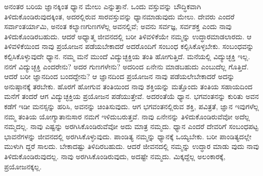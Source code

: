 ಅನಂತರ ಬರಿಯ ಜ್ಞಾನಕ್ಕಿಂತ ಧ್ಯಾನ ಮೇಲು ಎನ್ನುತ್ತಾನೆ. ಒಂದು ವಸ್ತುವನ್ನು ಬೌದ್ಧಿಕವಾಗಿ ತಿಳಿದುಕೊಂಡಿರುವುದಕ್ಕಿಂತ, ಅದರಲ್ಲಿರುವ ಸಾರವಸ್ತುವನ್ನು ಧ್ಯಾನಮಾಡುವುದು ಮೇಲು. ದೇವರು ಎಂದರೆ ಸರ್ವಾಂತರ್ಯಾಮಿ, ಅನಂತ ಕಲ್ಯಾಣಗುಣಗಳೆಲ್ಲ ಅವನಲ್ಲಿವೆ; ಅವನು ಸರ್ವಜ್ಞ, ಸರ್ವಶಕ್ತ ಎಂದು ನಾವು ತಿಳಿದುಕೊಂಡಿರಬಹುದು. ಆದರೆ ಅಧ್ಯಾತ್ಮ ಜೀವನದಲ್ಲಿ ಬರೀ ತಿಳಿವಳಿಕೆಯೇ ನಮ್ಮನ್ನು ಉದ್ಧಾರಮಾಡಲಾರದು. ಆ ತಿಳಿವಳಿಕೆಯಿಂದ ನಾವು ಪ್ರಯೋಜನ ಪಡೆಯಬೇಕಾದರೆ ಅದರೊಂದಿಗೆ ಸಂಬಂಧ ಕಲ್ಪಿಸಿಕೊಳ್ಳಬೇಕು. ಸಂಬಂಧವನ್ನು ಕಲ್ಪಿಸಿಕೊಳ್ಳುವುದೇ ಧ್ಯಾನ. ನಮ್ಮ ಮನೆ ಮುಂದೆ ವಿದ್ಯುಚ್ಛಕ್ತಿಯ ತಂತಿ ಹೋಗುತ್ತಿದೆ. ಮನೆಯಲ್ಲಿ ವಿದ್ಯುಚ್ಛಕ್ತಿ ಇಲ್ಲ. ನನಗೆ ವಿದ್ಯುಚ್ಛಕ್ತಿ ಎಂದರೇನು? ಅದರ ಗುಣಗಳೇನು? ಅದರಿಂದ ಏನೇನು ಮಾಡಬಹುದು ಎಂಬುದೆಲ್ಲ ಗೊತ್ತಿದೆ. ಆದರೆ ಬರೀ ಜ್ಞಾನದಿಂದ ಬಂದದ್ದೇನು? ಆ ಜ್ಞಾನದಿಂದ ಪ್ರಯೋಜನ ನಾವು ಪಡೆಯಲೇಬೇಕಾದರೆ ಅದನ್ನು ಅನುಷ್ಠಾನಕ್ಕೆ ತರಬೇಕು. ಹೊರಗೆ ಹೋಗುವ ತಂತಿಯಿಂದ ನಾವು ಶಕ್ತಿಯನ್ನು ಮತ್ತೊಂದು ತಂತಿಯ ಸಹಾಯದಿಂದ ಮನೆಗೆ ತಂದರೆ ಆಗ ವಿದ್ಯುಚ್ಛಕ್ತಿಯ ಪ್ರಯೋಜನ ಪಡೆಯುತ್ತೇವೆ. ಅದರಂತೆಯೆ ಧ್ಯಾನ. ಭಗವಂತನನ್ನು ಕುರಿತು ಅವನ ಕಡೆಗೆ ಇಡೀ ಮನಸ್ಸನ್ನು ಹರಿಸಿ, ಅವನನ್ನು ಚಿಂತಿಸುವುದು. ಆಗ ಭಗವಂತನಲ್ಲಿರುವ ಶಕ್ತಿ, ಪವಿತ್ರತೆ, ಜ್ಞಾನ ಇವುಗಳೆಲ್ಲ ನಮ್ಮ ತಂತಿಯ ಯೋಗ್ಯಾತಾನುಸಾರ ನಮಗೆ ಇಳಿದುಬರುತ್ತವೆ. ನಾವು ಏನೇನನ್ನು ತಿಳಿದುಕೊಂಡಿರುವೆವೋ ಅದೆಲ್ಲ ನಮ್ಮದಲ್ಲ. ನಾವು ಎಷ್ಟನ್ನು ಅರಗಿಸಿಕೊಂಡಿರುವೆವೋ ಅದು ಮಾತ್ರ ನಮ್ಮದು. ಧ್ಯಾನ ಎಂದರೆ ದೇವರಿಗೆ ಸಂಬಂಧಪಟ್ಟ ಭಾವನೆಗಳನ್ನು ಜೀವನದಲ್ಲಿ ಅರಗಿಸಿಕೊಳ್ಳುವುದು. ಪಾಂಡಿತ್ಯ ನಮ್ಮನ್ನು ಧ್ಯಾನಕ್ಕೆ ಒಯ್ಯಬೇಕು. ಬರೀ ಪಾಂಡಿತ್ಯದಲ್ಲೇ ಮುಳುಗಿ ದ್ದರೆ ಸಾಲದು. ಬೇಕಾದಷ್ಟು ತಿಳಿದಿರಬಹುದು. ಆದರೆ ಜೀವನದಲ್ಲಿ ನಮ್ಮನ್ನು ಉದ್ಧಾರ ಮಾಡು ವುದು ನಾವು ತಿಳಿದುಕೊಂಡಿರುವುದಲ್ಲ. ನಾವು ಅರಗಿಸಿಕೊಂಡಿರುವುದು, ಅದಷ್ಟೇ ನಮ್ಮದು. ಮಿಕ್ಕದ್ದೆಲ್ಲ ಅಲಂಕಾರಕ್ಕೆ, ಪ್ರಯೋಜನಕ್ಕಲ್ಲ.

